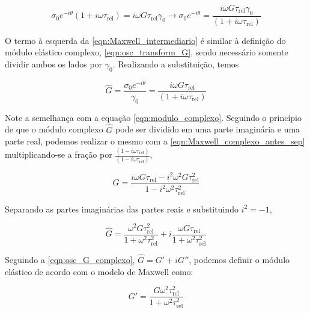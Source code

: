 			\begin{equation}
				\sigma_0e^{-i\theta} \left(   1 + i\omega\tau_{\textrm{rel}}  \right) = i\omega G\tau_{\textrm{rel}}\gamma_0 \to
				\sigma_0e^{-i\theta} = \dfrac{i\omega G\tau_{\textrm{rel}}\gamma_0}{\left(   1 + i\omega\tau_{\textrm{rel}}  \right)}
				\label{eqn:Maxwell_intermediario}
			\end{equation}
			
			O termo à esquerda da \autoref{eqn:Maxwell_intermediario} é similar à definição do módulo elástico complexo, \autoref{eqn:osc_transform_G}, sendo necessário somente dividir ambos os lados por \(\gamma_0\). Realizando a substituição, temos
			
			\begin{equation}
				\hat{G} = \dfrac{\sigma_0e^{-i\theta}}{\gamma_0} = \dfrac{i\omega G\tau_{\textrm{rel}}}{\left(   1 + i\omega\tau_{\textrm{rel}}  \right)}
				\label{eqn:Maxwell_complexo_antes_sep}
			\end{equation}
			
			Note a semelhança com a equação \ref{eqn:modulo_complexo}. Seguindo o princípio de que o módulo complexo \(\hat{G}\) pode ser dividido em uma parte imaginária e uma parte real, podemos realizar o mesmo com a \autoref{eqn:Maxwell_complexo_antes_sep} multiplicando-se a fração por \(\frac{\left(   1 - i\omega\tau_{\mathrm{rel}}  \right)}{\left(   1 - i\omega\tau_{\mathrm{rel}}  \right)}\),
			
			\begin{equation}
				\hat{G} = \dfrac{  i\omega G\tau_{\textrm{rel}} - i^2 \omega^2 G \tau_{\textrm{rel}}^2        }{  1 - i^2\omega^2 \tau_{\textrm{rel}}^2          }
				\label{eqn:Maxwell_complexo_antes_sep2}
			\end{equation}
			
			Separando as partes imaginárias das partes reais e substituindo \(i^2 = -1\),
			
			\begin{equation}
				\hat{G} = \dfrac{   \omega^2 G \tau_{\textrm{rel}}^2       }{  1 + \omega^2 \tau_{\textrm{rel}}^2      } + i \dfrac{   \omega G \tau_{\textrm{rel}}        }{ 1 + \omega^2 \tau_{\textrm{rel}}^2 }
				\label{eqn:Maxwell_substituido}
			\end{equation}
			
			Seguindo a \autoref{eqn:osc_G_complexo}, \(\hat{G} = G' + iG''\), podemos definir o módulo elástico de acordo com o modelo de Maxwell como:
			
			\begin{equation}
				G' = \dfrac{ G \omega^2 \tau_{\textrm{rel}}^2   }{  1 + \omega^2 \tau_{\textrm{rel}}^2      }
				\label{eqn:Maxwell_G1_def}
			\end{equation} 
			
